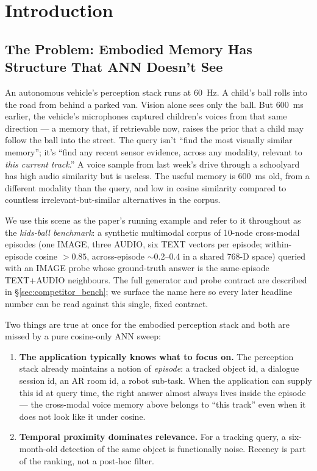 \documentclass[11pt]{article}
\begin{document}
\section{Introduction}
\label{sec:intro}

\subsection{The Problem: Embodied Memory Has Structure That ANN Doesn't See}

An autonomous vehicle's perception stack runs at 60~Hz. A child's ball
rolls into the road from behind a parked van. Vision alone sees only
the ball. But 600~ms earlier, the vehicle's microphones captured
children's voices from that same direction --- a memory that, if
retrievable now, raises the prior that a child may follow the ball
into the street. The query isn't ``find the most visually similar
memory''; it's ``find any recent sensor evidence, across any modality,
relevant to \emph{this current track}.'' A voice sample from last
week's drive through a schoolyard has high audio similarity but is
useless. The useful memory is 600~ms old, from a different modality
than the query, and low in cosine similarity compared to countless
irrelevant-but-similar alternatives in the corpus.

We use this scene as the paper's running example and refer to it
throughout as the \emph{kids-ball benchmark}: a synthetic
multimodal corpus of 10-node cross-modal episodes (one IMAGE,
three AUDIO, six TEXT vectors per episode; within-episode cosine
$> 0.85$, across-episode $\sim$0.2--0.4 in a shared 768-D space)
queried with an IMAGE probe whose ground-truth answer is the
same-episode TEXT+AUDIO neighbours. The full generator and probe
contract are described in \S\ref{sec:competitor_bench}; we surface
the name here so every later headline number can be read against
this single, fixed contract.

Two things are true at once for the embodied perception stack and
both are missed by a pure cosine-only ANN sweep:

\begin{enumerate}
\item \textbf{The application typically knows what to focus on.} The
  perception stack already maintains a notion of \emph{episode}: a
  tracked object id, a dialogue session id, an AR room id, a robot
  sub-task. When the application can supply this id at query time,
  the right answer almost always lives inside the episode --- the
  cross-modal voice memory above belongs to ``this track'' even when
  it does not look like it under cosine.
\item \textbf{Temporal proximity dominates relevance.} For a tracking
  query, a six-month-old detection of the same object is functionally
  noise. Recency is part of the ranking, not a post-hoc filter.
\end{enumerate}
\end{document}
